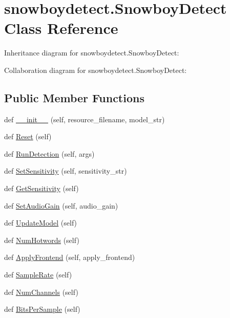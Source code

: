 \hypertarget{classsnowboydetect_1_1SnowboyDetect}{}\section{snowboydetect.\+Snowboy\+Detect Class Reference}
\label{classsnowboydetect_1_1SnowboyDetect}


Inheritance diagram for snowboydetect.\+Snowboy\+Detect\+:


Collaboration diagram for snowboydetect.\+Snowboy\+Detect\+:
\subsection*{Public Member Functions}
\begin{DoxyCompactItemize}
\item 
def \hyperlink{classsnowboydetect_1_1SnowboyDetect_aacebc037562e278d600502c85a6e6240}{\+\_\+\+\_\+init\+\_\+\+\_\+} (self, resource\+\_\+filename, model\+\_\+str)
\item 
def \hyperlink{classsnowboydetect_1_1SnowboyDetect_a721badd1050cbad9ecb3734610f5fec7}{Reset} (self)
\item 
def \hyperlink{classsnowboydetect_1_1SnowboyDetect_aa81c3446d9f86cdc82afe896b7503f92}{Run\+Detection} (self, args)
\item 
def \hyperlink{classsnowboydetect_1_1SnowboyDetect_a31672fe0859a72050c7e143c58c218c7}{Set\+Sensitivity} (self, sensitivity\+\_\+str)
\item 
def \hyperlink{classsnowboydetect_1_1SnowboyDetect_a836549077589837b8e94f563f3f9ff03}{Get\+Sensitivity} (self)
\item 
def \hyperlink{classsnowboydetect_1_1SnowboyDetect_acfa7c3d929aa0a1400a85f4c85883830}{Set\+Audio\+Gain} (self, audio\+\_\+gain)
\item 
def \hyperlink{classsnowboydetect_1_1SnowboyDetect_a5fe893dcbae408d4419b33b8f1c7db5a}{Update\+Model} (self)
\item 
def \hyperlink{classsnowboydetect_1_1SnowboyDetect_a281b6281e98d035872f289a4d31041dd}{Num\+Hotwords} (self)
\item 
def \hyperlink{classsnowboydetect_1_1SnowboyDetect_a4b4e6740fe532680390a8dcf3501a64a}{Apply\+Frontend} (self, apply\+\_\+frontend)
\item 
def \hyperlink{classsnowboydetect_1_1SnowboyDetect_aa4a6097517da1f8ba4fab8041e0748b8}{Sample\+Rate} (self)
\item 
def \hyperlink{classsnowboydetect_1_1SnowboyDetect_a46d9f2d6be050a727731557d7865ec96}{Num\+Channels} (self)
\item 
def \hyperlink{classsnowboydetect_1_1SnowboyDetect_a0281b47c8358e32c8aa464213b0dba97}{Bits\+Per\+Sample} (self)
\end{DoxyCompactItemize}
